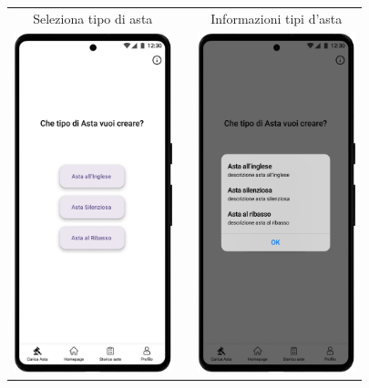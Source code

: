 \begin{center}
	\begin{tabular}{ccc}
		Seleziona tipo di asta                                           &  &
		Informazioni tipi d'asta                                                        \\
		\includegraphics[height=280pt]{images/mockup/Carica Asta 1..png} &  &
		\includegraphics[height=280pt]{images/mockup/Carica Asta 1. - informazioni.png} \\
	\end{tabular}
\end{center}

